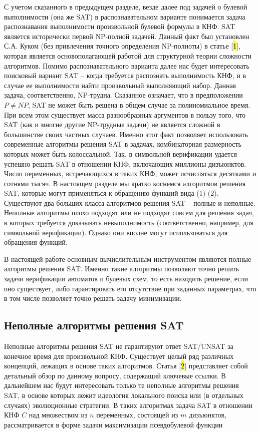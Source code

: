 С учетом сказанного в предыдущем разделе, везде далее под задачей о булевой выполнимости (она же SAT) в распознавательном варианте понимается задача распознавания выполнимости произвольной булевой формулы в КНФ. SAT является исторически первой NP-полной задачей. Данный факт был установлен С.А. Куком (без привлечения точного определения NP-полноты) в статье {[}\hl{1}{]}, которая является основополагающей работой для структурной теории сложности алгоритмов. Помимо распознавательного варианта далее нас будет интересовать поисковый вариант SAT \--- когда требуется распознать выполнимость КНФ, и в случае ее выполнимости найти произвольный выполняющий набор. Данная задача, соответственно, NP-трудна. Сказанное означает, что в предположении $P \neq NP$, SAT не может быть решена в общем случае за полиномиальное время. При всем этом существует масса разнообразных аргументов в пользу того, что SAT (как и многие другие NP-трудные задачи) не является сложной в большинстве своих частных случаев. Именно этот факт позволяет использовать современные алгоритмы решения SAT в задачах, комбинаторная размерность которых может быть колоссальной. Так, в символьной верификации удается успешно решать SAT в отношении КНФ, включающих миллионы дизъюнктов. Число переменных, встречающихся в таких КНФ, может исчисляться десятками и сотнями тысяч. В настоящем разделе мы кратко коснемся алгоритмов решения SAT, которые могут применяться к обращению функций вида (1)-(2). Существуют два больших класса алгоритмов решения SAT \--- полные и неполные. Неполные алгоритмы плохо подходят или не подходят совсем для решения задач, в которых требуется доказывать невыполнимость (соответственно, например, для символьной верификации). Однако они вполне могут использоваться для обращения функций.

В настоящей работе основным вычислительным инструментом являются полные алгоритмы решения SAT. Именно такие алгоритмы позволяют точно решать задачи верификации автоматов и булевых схем, то есть находить решение, если оно существует, либо гарантировать его отсутствие при заданных параметрах, что в том числе позволяет точно решать задачу минимизации.


\subsection{Неполные алгоритмы решения SAT}

Неполные алгоритмы решения SAT не гарантируют ответ SAT/UNSAT за конечное время для произвольной КНФ. Существует целый ряд различных концепций, лежащих в основе таких алгоритмов. Статья {[}\hl{2}{]} представляет собой детальный обзор по данному вопросу, содержащий ключевые ссылки. В дальнейшем нас будут интересовать только те неполные алгоритмы решения SAT, в основе которых лежит идеология локального поиска или (в отдельных случаях) эволюционные стратегии. В таких алгоритмах задача SAT в отношении КНФ $C$ над множеством из $n$ переменных, состоящей из $m$ дизъюнктов, рассматривается в форме задачи максимизации псевдобулевой функции

